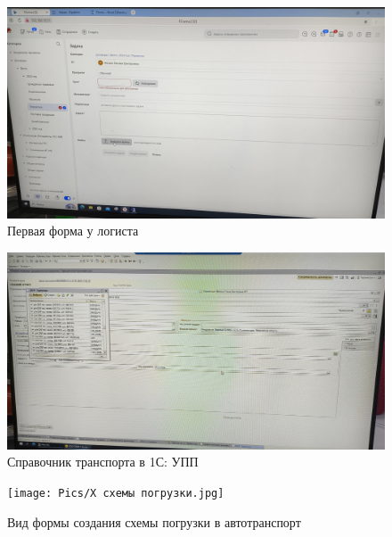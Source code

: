 \begin{figure}
\begin{center}
 \includegraphics[height=0.35\textheight, keepaspectratio]{Pics/Х первая форма.jpg}
\end{center}
 \caption{Первая форма у логиста}
 \label{pic:Х первая форма}
\end{figure}

\begin{figure}
\begin{center}
 \includegraphics[height=0.3\textheight, keepaspectratio]{Pics/Х справочник транспорта.jpg}
\end{center}
 \caption{Справочник транспорта в 1С: УПП}
 \label{pic:Х справочник транспорта}
\end{figure}

\begin{figure}
\begin{center}
 \texttt{[image: Pics/Х схемы погрузки.jpg]}
\end{center}
 \caption{Вид формы создания схемы погрузки в автотранспорт}
 \label{pic:Х схемы погрузки}
\end{figure}

